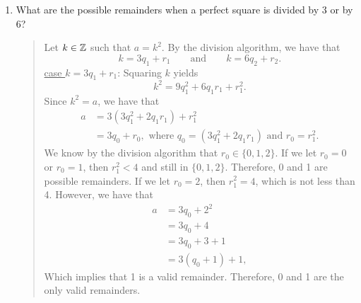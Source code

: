 \documentclass{hw}
\begin{document}

\begin{enumerate}
\item What are the possible remainders when a perfect square is divided by 3 or by 6?
\begin{quote}
Let $k\in\mathbb{Z}$ such that $a = k^{2}$. By the division algorithm, we have that
\[
k = 3q_{1} + r_{1} \qquad\text{and}\qquad k = 6q_{2} + r_{2}.
\]
\underline{case $k = 3q_{1} + r_{1}$}: Squaring $k$ yields
\[
k^{2} = 9q_{1}^{2} + 6q_{1}r_{1} + r_{1}^{2}.
\]
Since $k^{2} = a$, we have that
\begin{align*}
a &= 3(3q_{1}^{2} + 2q_{1}r_{1}) + r_{1}^{2}\\
&= 3q_{0} + r_{0},\text{ where } q_{0} = (3q_{1}^{2} + 2q_{1}r_{1})\text{ and } r_{0} = r_{1}^{2}.
\end{align*}
We know by the division algorithm that $r_{0}\in\{ 0,1,2\}$. If we let $r_{0} = 0$ or $r_{0} = 1$, then
$r_{1}^{2} < 4$ and still in $\{ 0,1,2\}$. Therefore, 0 and 1 are possible remainders. If we let
$r_{0} = 2$, then $r_{1}^{2} = 4$, which is not less than 4. However, we have that
\begin{align*}
a &= 3q_{0} + 2^{2}\\
&= 3q_{0} + 4\\
&= 3q_{0} + 3 + 1\\
&= 3(q_{0} + 1) + 1,
\end{align*}
Which implies that 1 is a valid remainder. Therefore, 0 and 1 are the only valid remainders.\\


\end{quote}
\end{enumerate}
\end{document}
